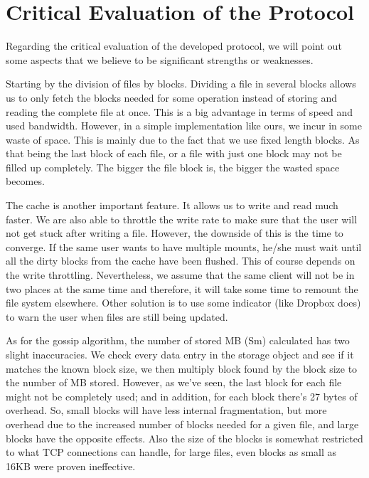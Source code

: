 \documentclass[times,9pt,article]{llncs}
\begin{document}
\section{Critical Evaluation of the Protocol}

Regarding the critical evaluation of the developed protocol, we will point out some aspects that we believe to be significant strengths or weaknesses.

Starting by the division of files by blocks. Dividing a file in several blocks allows us to only fetch the blocks needed for some operation instead of storing and reading the complete file at once. This is a big advantage in terms of speed and used bandwidth. However, in a simple implementation like ours, we incur in some waste of space. This is mainly due to the fact that we use fixed length blocks. As that being the last block of each file, or a file with just one block may not be filled up completely. The bigger the file block is, the bigger the wasted space becomes.

The cache is another important feature. It allows us to write and read much faster. We are also able to throttle the write rate to make sure that the user will not get stuck after writing a file. However, the downside of this is the time to converge. If the same user wants to have multiple mounts, he/she must wait until all the dirty blocks from the cache have been flushed. This of course depends on the write throttling. Nevertheless, we assume that the same client will not be in two places at the same time and therefore, it will take some time to remount the file system elsewhere. Other solution is to use some indicator (like Dropbox does) to warn the user when files are still being updated. 

As for the gossip algorithm, the number of stored MB (Sm) calculated has two slight inaccuracies. We check every data entry in the storage object and see if it matches the known block size, we then multiply block found by the block size to the number of MB stored. However, as we've seen, the last block for each file might not be completely used; and in addition, for each block there's 27 bytes of overhead. So, small blocks will have less internal fragmentation, but more overhead due to the increased number of blocks needed for a given file, and large blocks have the opposite effects. Also the size of the blocks is somewhat restricted to what TCP connections can handle, for large files, even blocks as small as 16KB were proven ineffective.
\end{document}
